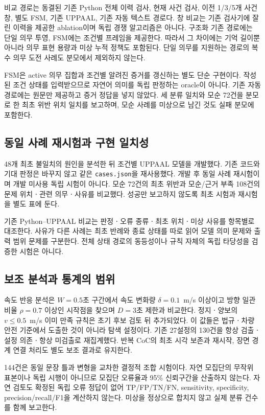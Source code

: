 \begin{revision}
비교 경로는 동결된 기존 Python 전체 이력 검사, 현재 사건 검사, 이전 1/3/5개 사건 창, 별도 FSM, 기존 UPPAAL, 기존 자동 텍스트 경로다. 창 비교는 기존 검사기에 잘린 이력을 제공한 ablation이며 독립 경쟁 알고리즘은 아니다. 구조화 기존 경로에는 단일 의무 투영, FSM에는 조건별 프레임을 제공한다. 따라서 그 차이에는 기억 길이뿐 아니라 의무 표현 용량과 미상 누적 정책도 포함된다. 단일 의무를 지원하는 경로의 복수 의무 도전 사례도 분모에서 제외하지 않는다.

FSM은 active 의무 집합과 조건별 알려진 증거를 갱신하는 별도 단순 구현이다. 작성된 조건 상태를 입력받으므로 자연어 의미를 독립 판정하는 oracle이 아니다. 기존 자동 경로에는 원문만 제공하고 증거 정답을 넣지 않았다. 세 분류 일치와 모순 72건을 분모로 한 최초 위반 위치 일치를 보고하며, 모순 사례를 미상으로 남긴 것도 실패 분모에 포함한다.

\subsection{동일 사례 재시험과 구현 일치성}
\label{sec:retest-design}
48개 최초 불일치의 원인을 분석한 뒤 조건별 UPPAAL 모델을 개발했다. 기존 코드와 기대 판정은 바꾸지 않고 같은 \texttt{cases.json}을 재사용했다. 개발 후 동일 사례 재시험이며 개발 미사용 독립 시험이 아니다. 모순 72건의 최초 위반과 모순/근거 부족 108건의 문제 위치ㆍ관련 의무ㆍ사유를 비교했다. 성공만 보고하지 않도록 최초 시험과 재시험을 별도 표에 둔다.

기존 Python--UPPAAL 비교는 판정ㆍ오류 종류ㆍ최초 위치ㆍ미상 사유를 항목별로 대조한다. 사유가 다른 사례는 최초 반례와 종료 상태를 따로 읽어 모델 의미 문제와 출력 범위 문제를 구분한다. 전체 상태 경로의 동등성이나 규칙 자체의 독립 타당성을 검증한 시험은 아니다.

\subsection{보조 분석과 통계의 범위}
\label{sec:aux-design}
속도 반응 분석은 $W=0.5$초 구간에서 속도 변화량 $\delta=0.1$~m/s 이상이고 방향 일관 비율 $\rho=0.7$ 이상인 시작점을 찾으며 $D=3$초 제한과 비교한다. 정지ㆍ양보의 $v\leq0.5$~m/s 이미 만족 규칙은 초기 후보 검토 뒤 추가되었다. 이 값들은 법규ㆍ차량 안전 기준에서 도출한 것이 아니라 탐색 설정이다. 기존 27설정의 130건을 항상 검출ㆍ설정 의존ㆍ항상 미검출로 재집계했다. 반복 CoC의 최초 시각 보존과 재시작, 장면 경계 연결 처리도 별도 보조 결과로 유지한다.

144건은 동일 문장 틀과 변형을 교차한 결정적 조합 시험이다. 자연 모집단의 무작위 표본이나 독립 시행이 아니므로 모집단 오류율과 95\% 신뢰구간을 산출하지 않는다. 자연 검토도 확정된 독립 오류 정답이 없어 TP/FP/TN/FN, sensitivity, specificity, precision/recall/F1을 계산하지 않는다. 미상을 정상으로 합치지 않고 실제 분류 건수를 함께 보고한다.
\end{revision}
